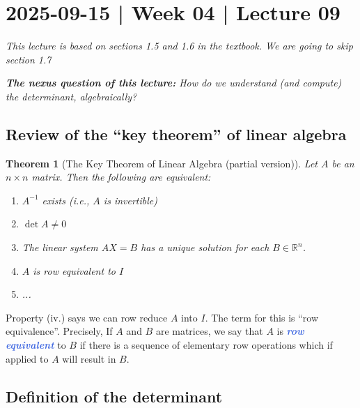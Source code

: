 \documentclass[10pt]{article}
\newcommand{\demph}[1]{\textcolor{RoyalBlue}{\textbf{\slshape #1}}} %
\newtheorem{theorem}{Theorem}
\theoremstyle{definition}
\newcommand{\R}{\mathbb{R}}           %
\begin{document}
\newpage
\section{2025-09-15 | Week 04 | Lecture 09}

\textit{This lecture is based on sections 1.5 and 1.6 in the textbook. We are
  going to skip section 1.7}



\begin{center}
  \begin{tcolorbox}[width=0.9\textwidth, colback=white, colframe=black]
    \textit{\textbf{The nexus question of this lecture:} How do we understand
      (and compute) the determinant, algebraically?}
  \end{tcolorbox}
\end{center}

\subsection{Review of the ``key theorem'' of linear algebra}


\begin{theorem}[The Key Theorem of Linear Algebra (partial version)]
  \label{thm:key-theorem-linear-algebra-(partial-version))}
  Let $A$ be an $n\times n$ matrix. Then the following are equivalent:
  \begin{enumerate}[label=(\roman*.)]
    \item $A^{-1}$ exists (i.e., $A$ is invertible)
    \item $\det A \neq 0$
    \item The linear system $AX=B$ has a unique solution for each $B\in
    \R^{n}$.
    \item $A$ is row equivalent to $I$
    \item ... 
  \end{enumerate}
\end{theorem}

Property (iv.) says we can row reduce $A$ into $I$. The term for this is ``row
equivalence''. Precisely, If $A$ and $B$ are matrices, we say that $A$ is
\demph{row equivalent} to $B$ if there is a sequence of elementary row
operations which if applied to $A$ will result in $B$.


\subsection{Definition of the determinant}
\end{document}
